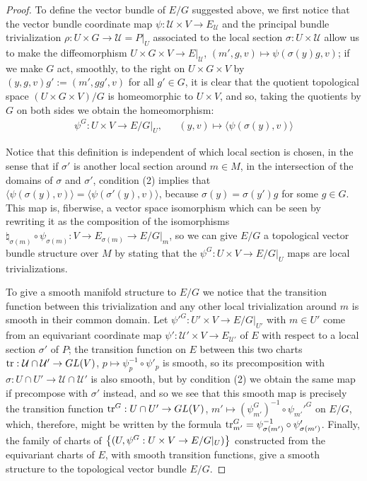 \begin{proof}
To define the vector bundle of $E/G$ suggested above, we first notice that the vector bundle coordinate map $\psi:\mathcal U \times V \to E_\mathcal U$ and the principal bundle trivialization $\rho: U \times G \to \mathcal U = P|_U$ associated to the local section $\sigma: U \times \mathcal U$ allow us to make the diffeomorphism $U \times G \times V \to E|_\mathcal U$, $(m', g, v) \mapsto \psi(\sigma(y)g, v)$; if we make $G$ act, smoothly, to the right on $U \times G \times V$ by $(y, g, v)g' := (m', gg', v)$ for all $g' \in G$, it is clear that the quotient topological space $(U \times G \times V) / G$ is homeomorphic to $U \times V$, and so, taking the quotients by $G$ on both sides we obtain the homeomorphism:
\begin{align*}
    \psi^{G}: U \times V \to E/G|_{U},&& (y, v) \mapsto \langle \psi(\sigma(y), v) \rangle
\end{align*}
    
Notice that this definition is independent of which local section is chosen, in the sense that if $\sigma'$ is another local section around $m \in M$, in the intersection of the domains of $\sigma$ and $\sigma'$, condition (2) implies that $\langle \psi(\sigma(y), v) \rangle  = \langle \psi(\sigma'(y), v) \rangle$, because $\sigma(y) = \sigma(y')g$ for some $g \in G$. This map is, fiberwise, a vector space isomorphism which can be seen by rewriting it as the composition of the isomorphisms $\natural_{\sigma(m)} \circ \psi_{\sigma(m)}: V \to E_{\sigma(m)} \to E/G|_m$, so we can give $E/G$ a topological vector bundle structure over $M$ by stating that the $\psi^{G}:U \times V \to E/G|_U$ maps are local trivializations.

To give a smooth manifold structure to $E/G$ we notice that the transition function between this trivialization and any other local trivialization around $m$ is smooth in their common domain. Let $\psi'^G:U' \times V \to E/G|_{U'}$ with $m \in U'$ come from an equivariant coordinate map $\psi': \mathcal U' \times V \to E_{\mathcal U'}$ of $E$ with respect to a local section $\sigma'$ of $P$; the transition function on $E$ between this two charts $\operatorname{tr}: \mathcal U \cap \mathcal U' \to GL(V)$, $p \mapsto \psi^{-1}_p \circ \psi'_p$ is smooth, so its precomposition with $\sigma: U \cap U' \to \mathcal U \cap \mathcal U'$ is also smooth, but by condition (2) we obtain the same map if precompose with $\sigma'$ instead, and so we see that this smooth map is precisely the transition function $\operatorname{tr}^{G}: U \cap U' \to GL(V)$, $m' \mapsto (\psi_{m'}^{G})^{-1} \circ \psi_{m'}'^G$  on $E/G$, which, therefore, might be written by the formula $\operatorname{tr}^G_{m'} = \psi^{-1}_{\sigma(m')} \circ \psi'_{\sigma(m')}$. Finally, the family of charts of $\left\{ (U, \psi^{G}:U \times V \to E/G|_U) \right\}$ constructed from the equivariant charts of $E$, with smooth transition functions, give a smooth structure to the topological vector bundle $E/G$.


\end{proof}
